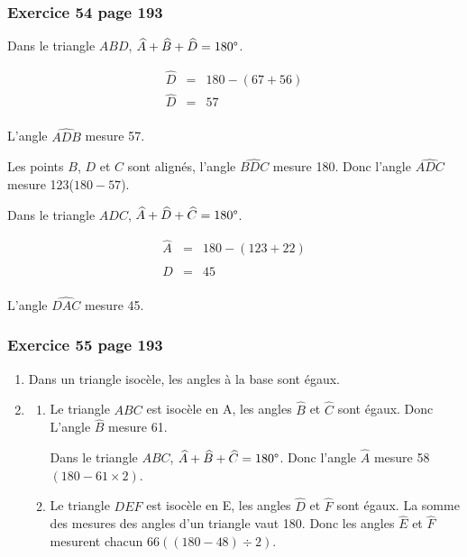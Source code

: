 \documentclass[xcolor={dvipsnames}]{beamer}
\begin{document}
\begin{frame}
	\frametitle{Exercice 54 page 193}
	

		Dans le triangle $ABD$, $\widehat{A} + \widehat{B} + \widehat{D} = 180\degree$.
		
		\vspace*{-0.5cm}
		\begin{eqnarray*}
			\widehat{D} &=& 180 - (67 + 56)\\ 
			\widehat{D} &=& 57\\
		\end{eqnarray*}
		\vspace*{-0.75cm}
		
		L'angle $\widehat{ADB}$ mesure 57\degree. \pause
		
		Les points $B$, $D$ et $C$ sont alignés, l'angle $\widehat{BDC}$ mesure 180\degree. \pause Donc l'angle $\widehat{ADC}$ mesure 123\degree ($180 - 57$).\pause

		Dans le triangle $ADC$, $\widehat{A} + \widehat{D} + \widehat{C} = 180\degree$.
		
		\vspace*{-0.5cm}
		\begin{eqnarray*}
			\widehat{A} &=& 180 - (123 + 22)\\ 
			\widehat{D} &=& 45\\
		\end{eqnarray*}
		\vspace*{-0.75cm}
		
		L'angle $\widehat{DAC}$ mesure 45\degree.
	
\end{frame}


\begin{frame}
	\frametitle{Exercice 55 page 193}
	
	
	\begin{enumerate}
		\item Dans un triangle isocèle, les angles à la base sont égaux.\pause
		
		
		\item \begin{enumerate}
			\item Le triangle $ABC$ est isocèle en A, les angles $\widehat{B}$ et $\widehat{C}$ sont égaux. Donc L'angle $\widehat{B}$ mesure 61\degree.\pause
			
			Dans le triangle $ABC$, $\widehat{A} + \widehat{B} + \widehat{C} = 180\degree$. Donc l'angle $\widehat{A}$ mesure 58\degree $(180 - 61 \times 2)$. \pause
			
			
			\item Le triangle $DEF$ est isocèle en E, les angles $\widehat{D}$ et $\widehat{F}$ sont égaux. \pause 
			La somme des mesures des angles d'un triangle vaut 180\degree. 
			Donc les angles $\widehat{E}$ et $\widehat{F}$ mesurent chacun 66\degree $((180 - 48) \div 2).$
		\end{enumerate}
	\end{enumerate}
\end{frame}
\end{document}
